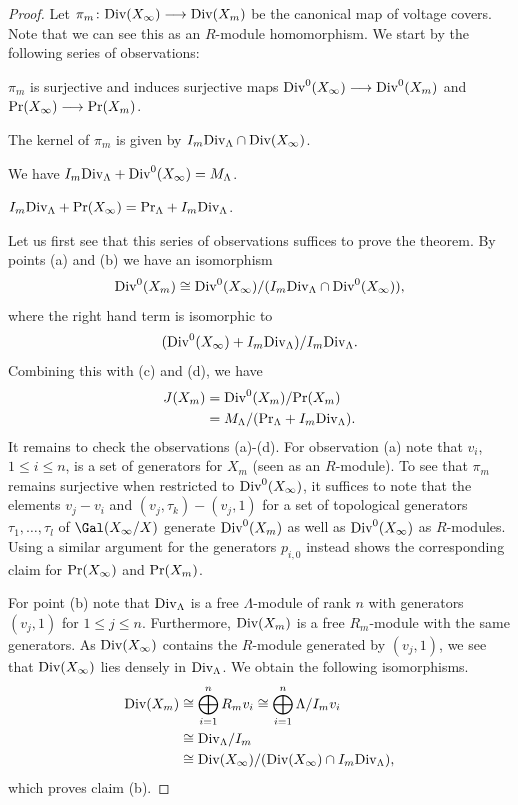 \begin{proof}
	Let $\pi_m\colon \textup{Div}(X_\infty)\longrightarrow \textup{Div}(X_m)$ be the canonical map of voltage covers. Note that we can see this as an $R$-module homomorphism. We start by the following series of observations:
	\begin{compactenum}[(a)]
		\item $\pi_m$ is surjective and induces surjective maps $\textup{Div}^0(X_\infty)\longrightarrow \textup{Div}^0(X_m)$ and ${\textup{Pr}(X_\infty)\longrightarrow \textup{Pr}(X_m)}$.
		\item The kernel of $\pi_m$ is given by $I_m\textup{Div}_\Lambda\cap \textup{Div}(X_\infty)$.
		\item We have $I_m\textup{Div}_\Lambda+\textup{Div}^0(X_\infty)=M_\Lambda$.
		\item $I_m\textup{Div}_\Lambda+\textup{Pr}(X_\infty)=\textup{Pr}_\Lambda+I_m\textup{Div}_\Lambda$. 
	\end{compactenum}
	Let us first see that this series of observations suffices to prove the theorem.
	By points (a) and (b) we have an isomorphism
	\[\textup{Div}^0(X_m)\cong \textup{Div}^0(X_\infty)/(I_m \textup{Div}_\Lambda\cap \textup{Div}^0(X_\infty)),\] where the right hand term is isomorphic to \[(\textup{Div}^0(X_\infty)+I_m\textup{Div}_\Lambda)/I_m\textup{Div}_\Lambda.\]
	Combining this with (c) and (d), we have
	\begin{align*}
		J(X_m)& = \textup{Div}^0(X_m) / \textup{Pr}(X_m) \\ 
		&=M_\Lambda/(\textup{Pr}_\Lambda+I_m\textup{Div}_\Lambda).
	\end{align*}
	It remains to check the observations (a)-(d). For observation (a) note that $v_i$, ${1\le i\le n}$, is a set of generators for $X_m$ (seen as an $R$-module). 
	To see that $\pi_m$ remains surjective when restricted to $\textup{Div}^0(X_\infty)$, it suffices to note that the elements ${v_{j}-v_{i}}$ and ${(v_j, \tau_k)-(v_{j},1)}$ for a  set of topological generators ${\tau_1,\ldots, \tau_l}$ of $\Gal(X_\infty/X)$ generate $\textup{Div}^0(X_m)$ as well as $\textup{Div}^0(X_\infty)$ as $R$-modules. Using a similar argument for the generators $p_{i,0}$ instead shows the corresponding claim for $\textup{Pr}(X_\infty)$ and $\textup{Pr}(X_m)$.
	
	For point (b) note that $\textup{Div}_\Lambda$ is a free $\Lambda$-module of rank $n$ with generators $(v_j,1)$ for ${1\le j\le n}$. Furthermore, $\textup{Div}(X_m)$ is a free $R_m$-module with the same generators. As $\textup{Div}(X_\infty)$ contains the $R$-module generated by $(v_j,1)$, we see that $\textup{Div}(X_\infty)$ lies densely in $\textup{Div}_\Lambda$. We obtain the following isomorphisms. 
	\begin{align*}
		\textup{Div}(X_m)&\cong \bigoplus_{i=1}^n R_m v_i\cong 
		\bigoplus_{i=1}^n \Lambda/I_m v_i\\ 
		&\cong \textup{Div}_\Lambda/I_m\\
		&\cong \textup{Div}(X_\infty)/(\textup{Div}(X_\infty)\cap I_m\textup{Div}_\Lambda),\end{align*} which proves claim (b).
	

\end{proof}
